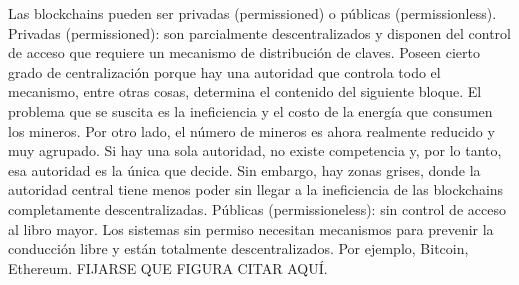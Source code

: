 \documentclass[12pt]{report} %
\begin{document}
Las blockchains pueden ser privadas  (permissioned) o públicas (permissionless). 
Privadas (permissioned): son parcialmente descentralizados y disponen del control de acceso que requiere un mecanismo de distribución de claves. Poseen cierto grado de centralización porque hay una autoridad que controla todo el mecanismo, entre otras cosas, determina el contenido del siguiente bloque. El problema que se suscita es la ineficiencia y el costo de la energía que consumen los mineros. Por otro lado, el número de mineros es ahora realmente reducido y muy agrupado. Si hay una sola autoridad, no existe competencia y, por lo tanto, esa autoridad es la única que decide. Sin embargo, hay zonas grises, donde la autoridad central tiene menos poder sin llegar a la ineficiencia de las blockchains completamente descentralizadas. 
Públicas (permissioneless): sin control de acceso al libro mayor. Los sistemas sin permiso necesitan mecanismos para prevenir la conducción libre y están totalmente descentralizados. Por ejemplo, Bitcoin, Ethereum. FIJARSE QUE FIGURA CITAR AQUÍ. 
\end{document}

